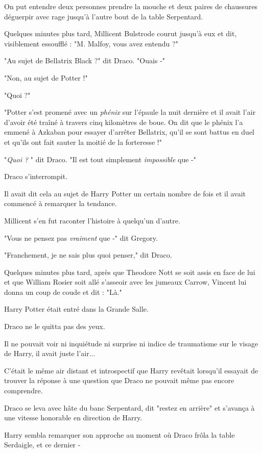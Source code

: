 On put entendre deux personnes prendre la mouche et deux paires de chaussures déguerpir avec rage jusqu'à l'autre bout de la table Serpentard.

Quelques minutes plus tard, Millicent Bulstrode courut jusqu'à eux et dit, visiblement essoufflé : "M. Malfoy, vous avez entendu ?"

"Au sujet de Bellatrix Black ?" dit Draco. "Ouais -"

"Non, au sujet de Potter !"

"Quoi ?"

"Potter s'est promené avec un \emph{phénix}  sur l'épaule la nuit dernière et il avait l'air d'avoir été traîné à travers cinq kilomètres de boue. On dit que le phénix l'a emmené à Azkaban pour essayer d'arrêter Bellatrix, qu'il se sont battus en duel et qu'ils ont fait sauter la moitié de la forteresse !"

"\emph{Quoi ?} " dit Draco. "Il est tout simplement \emph{impossible}  que -"

Draco s'interrompit.

Il avait dit cela au sujet de Harry Potter un certain nombre de fois et il avait commencé à remarquer la tendance.

Millicent s'en fut raconter l'histoire à quelqu'un d'autre.

"Vous ne pensez pas \emph{vraiment } que -" dit Gregory.

"Franchement, je ne sais plus quoi penser," dit Draco.

Quelques minutes plus tard, après que Theodore Nott se soit assis en face de lui et que William Rosier soit allé s'asseoir avec les jumeaux Carrow, Vincent lui donna un coup de coude et dit : "Là."

Harry Potter était entré dans la Grande Salle.

Draco ne le quitta pas des yeux.

Il ne pouvait voir ni inquiétude ni surprise ni indice de traumatisme sur le visage de Harry, il avait juste l'air...

C'était le même air distant et introspectif que Harry revêtait lorsqu'il essayait de trouver la réponse à une question que Draco ne pouvait même pas encore comprendre.

Draco se leva avec hâte du banc Serpentard, dit "restez en arrière" et s'avança à une vitesse honorable en direction de Harry.

Harry sembla remarquer son approche au moment où Draco frôla la table Serdaigle, et ce dernier -

